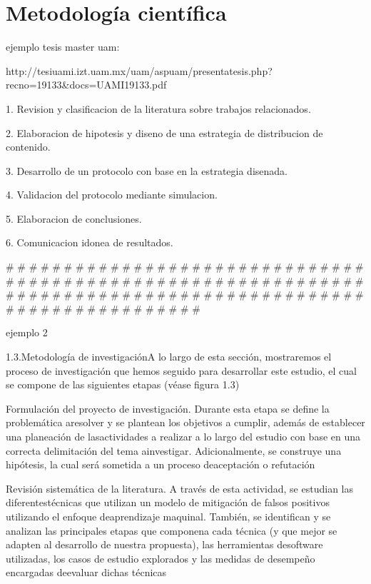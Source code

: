 \section {Metodología científica}

ejemplo tesis master uam:

http://tesiuami.izt.uam.mx/uam/aspuam/presentatesis.php?recno=19133\&docs=UAMI19133.pdf

1. Revision y clasificacion de la literatura sobre trabajos relacionados.

2. Elaboracion de hipotesis y diseno de una estrategia de distribucion de contenido.

3. Desarrollo de un protocolo con base en la estrategia disenada.

4. Validacion del protocolo mediante simulacion.

5. Elaboracion de conclusiones.

6. Comunicacion idonea de resultados.

\# \# \# \# \# \# \# \# \# \# \# \# \# \# \# \# \# \# \# \# \# \# \# \# \# \# \# \# \# \# \# \# \# \# \# \# \# \# \# \# \# \# \# \# \# \# \# \# \# \# \# \# \# \# \# \# \# \# \# \# \# \# \# \# \# \# \# \# \# \# \# \# \# \# \# \# \# \# \# \# \# \# \# \# \# \# \# \# \# \# \# \# \# \# \# \# \# \# \# \# \# \# \# \# \# \# \# \# \# \# 

ejemplo 2

1.3.Metodología de investigaciónA lo largo de esta sección, mostraremos el proceso de investigación que hemos seguido para desarrollar este estudio, el cual se compone de las siguientes etapas (véase figura 1.3)

Formulación del proyecto de investigación. Durante esta etapa se define la problemática aresolver y se plantean los objetivos a cumplir, además de establecer una planeación de lasactividades a realizar a lo largo del estudio con base en una correcta delimitación del tema ainvestigar. Adicionalmente, se construye una hipótesis, la cual será sometida a un proceso deaceptación o refutación

Revisión sistemática de la literatura. A través de esta actividad, se estudian las diferentestécnicas que utilizan un modelo de mitigación de falsos positivos utilizando el enfoque deaprendizaje maquinal. También, se identifican y se analizan las principales etapas que componena cada técnica (y que mejor se adapten al desarrollo de nuestra propuesta), las herramientas desoftware utilizadas, los casos de estudio explorados y las medidas de desempeño encargadas deevaluar dichas técnicas

